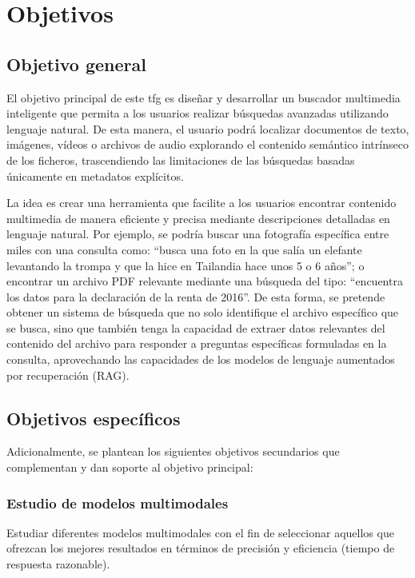 
\chapter{Objetivos}
\label{objetivos}

\section{Objetivo general}
El objetivo principal de este \gls{tfg} es diseñar y desarrollar un buscador multimedia inteligente que permita a los usuarios realizar búsquedas avanzadas utilizando lenguaje natural. De esta manera, el usuario podrá localizar documentos de texto, imágenes, vídeos o archivos de audio explorando el contenido semántico intrínseco de los ficheros, trascendiendo las limitaciones de las búsquedas basadas únicamente en metadatos explícitos.

La idea es crear una herramienta que facilite a los usuarios encontrar contenido multimedia de manera eficiente y precisa mediante descripciones detalladas en lenguaje natural. Por ejemplo, se podría buscar una fotografía específica entre miles con una consulta como: “busca una foto en la que salía un elefante levantando la trompa y que la hice en Tailandia hace unos 5 o 6 años”; o encontrar un archivo PDF relevante mediante una búsqueda del tipo: “encuentra los datos para la declaración de la renta de 2016”.
De esta forma, se pretende obtener un sistema de búsqueda que no solo identifique el archivo específico que se busca, sino que también tenga la capacidad de extraer datos relevantes del contenido del archivo para responder a preguntas específicas formuladas en la consulta, aprovechando las capacidades de los modelos de lenguaje aumentados por recuperación (RAG).

\section{Objetivos específicos}
Adicionalmente, se plantean los siguientes objetivos secundarios que complementan y dan soporte al objetivo principal:
\subsection{Estudio de modelos multimodales}
Estudiar diferentes modelos multimodales con el fin de seleccionar aquellos que ofrezcan los mejores resultados en términos de precisión y eficiencia (tiempo de respuesta razonable).
